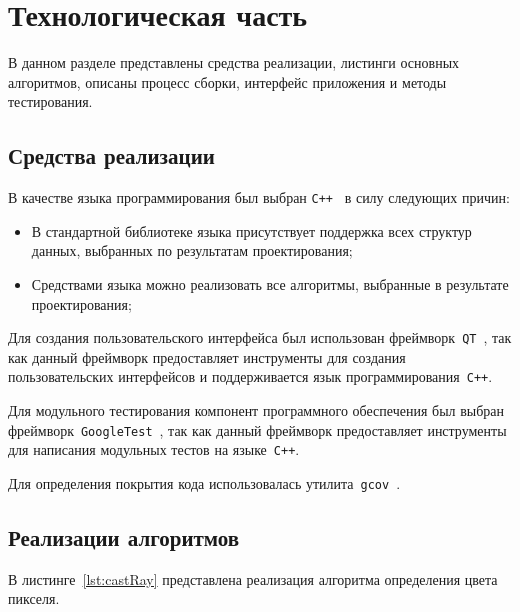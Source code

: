 \chapter{Технологическая часть}

В данном разделе представлены средства реализации, листинги основных алгоритмов, описаны процесс сборки, интерфейс приложения и методы тестирования.

\section{Средства реализации}
В качестве языка программирования был выбран \texttt{C++}~\cite{cpp} в силу следующих причин:
\begin{itemize}
	\item В стандартной библиотеке языка присутствует поддержка всех структур данных, выбранных по результатам проектирования;
	\item Средствами языка можно реализовать все алгоритмы, выбранные в результате проектирования;
\end{itemize}

Для создания пользовательского интерфейса был использован фреймворк~\texttt{QT}~\cite{qt}, так как данный фреймворк предоставляет инструменты для создания пользовательских интерфейсов и поддерживается язык программирования~\texttt{C++}.


Для модульного тестирования компонент программного обеспечения был выбран фреймворк~\texttt{GoogleTest}~\cite{gtest}, так как данный фреймворк предоставляет инструменты для написания модульных тестов на языке~\texttt{C++}.

Для определения покрытия кода использовалась утилита~\texttt{gcov}~\cite{gcov}.

\clearpage
\section{Реализации алгоритмов}
В листинге~\ref{lst:castRay} представлена реализация алгоритма определения цвета пикселя.


